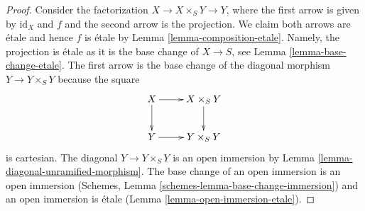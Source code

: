 \documentclass[10pt,a4paper]{amsart}
\theoremstyle{plain}
\theoremstyle{definition}
\theoremstyle{remark}
\numberwithin{equation}{subsection}
\begin{document}
\begin{proof}
Consider the factorization $X \to X \times_S Y \to Y$, where the first arrow
is given by $\text{id}_X$ and $f$ and the second arrow is the projection.
We claim both arrows are \'etale and hence $f$ is \'etale by
Lemma \ref{lemma-composition-etale}. Namely, the projection is \'etale
as it is the base change of $X \to S$, see Lemma \ref{lemma-base-change-etale}.
The first arrow is the base change of the diagonal morphism
$Y \to Y \times_S Y$ because the square
$$
\xymatrix{
X \ar[d] \ar[r] & X \times_S Y \ar[d] \\
Y \ar[r] & Y \times_S Y
}
$$
is cartesian. The diagonal $Y \to Y \times_S Y$ is an open immersion by
Lemma \ref{lemma-diagonal-unramified-morphism}. The base change
of an open immersion is an open immersion
(Schemes, Lemma \ref{schemes-lemma-base-change-immersion})
and an open immersion is \'etale
(Lemma \ref{lemma-open-immersion-etale}).
\end{proof}
\end{document}
